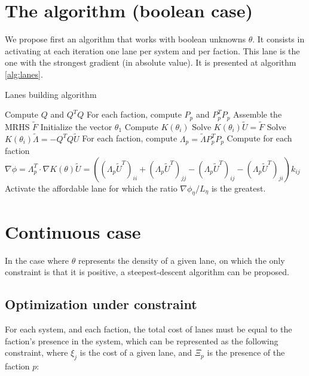\documentclass[11pt,a4paper]{article}		%
\begin{document}
\section{The algorithm (boolean case)}

We propose first an algorithm that works with boolean unknowns $\theta$. It consists in activating at each iteration one lane per system and per faction. This lane is the one with the strongest gradient (in absolute value). It is presented at algorithm \ref{alg:lanes}.

\begin{algorithm}[ht]
	\caption{Lanes building algorithm}
	\label{alg:lanes}
	\begin{algorithmic}
		\STATE Compute $Q$ and $Q^TQ$
		\STATE For each faction, compute $P_p$ and $P_p^TP_p$
		\STATE Assemble the MRHS $\tilde{F}$
		\STATE Initialize the vector $\theta_1$
			\STATE Compute $K(\theta_i)$
			\STATE Solve $K(\theta_i)\tilde{U} = \tilde{F}$
			\STATE Solve $K(\theta_i)\tilde{\Lambda} = - Q^TQ\tilde{U}$
			\STATE For each faction, compute $\Lambda_p = \tilde{\Lambda}P_p^TP_p$
			\STATE Compute for each faction $\nabla\phi = \Lambda_p^T \cdot \nabla K(\theta) \tilde{U} = \left( ( \Lambda_p\tilde{U}^T )_{ii} + ( \Lambda_p\tilde{U}^T )_{jj} - ( \Lambda_p\tilde{U}^T )_{ij} - ( \Lambda_p\tilde{U}^T )_{ji} \right) k_{ij}$
					\STATE Activate the affordable lane for which the ratio $\nabla\phi_\eta / L_\eta$ is the greatest.
				\ENDFOR
			\ENDFOR
		\ENDFOR
	\end{algorithmic}
\end{algorithm}

\section{Continuous case}

In the case where $\theta$ represents the density of a given lane, on which the only constraint is that it is positive, a steepest-descent algorithm can be proposed.

\subsection{Optimization under constraint}

For each system, and each faction, the total cost of lanes must be equal to the faction's presence in the system, which can be represented as the following constraint, where $\xi_j$ is the cost of a given lane, and $\Xi_p$ is the presence of the faction $p$:
\end{document}
